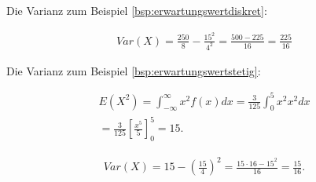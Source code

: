 \documentclass{tufte-handout}
\theoremstyle{own}
\begin{document}
Die Varianz zum Beispiel \autoref{bsp:erwartungswertdiskret}:

\begin{gather*}
Var(X) = \frac{250}{8} - \frac{15^2}{4^2} = \frac{500-225}{16} = \frac{225}{16}
\end{gather*}

Die Varianz zum Beispiel \autoref{bsp:erwartungswertstetig}:

\begin{gather*}
E(X^2) = \int_{-\infty}^\infty x^2 f(x) dx = \frac{3}{125} \int_0^5 x^2 x^2 dx \\
= \frac{3}{125} [\frac{x^5}{5}]_0^5 = 15.
\end{gather*}

\begin{gather*}
Var(X) = 15 - (\frac{15}{4})^2 = \frac{15 \cdot 16 - 15^2}{16} = \frac{15}{16}.
\end{gather*}




\end{document}
